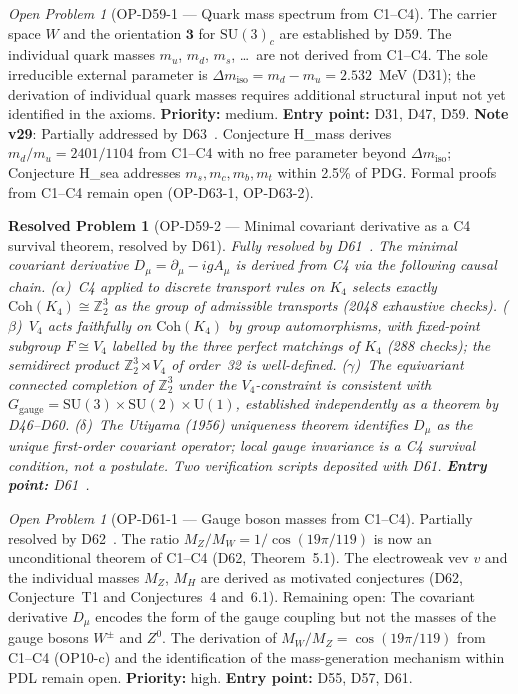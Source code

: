 \documentclass[11pt,a4paper]{article}
\newtheorem{resolvedproblem}{Resolved Problem}
\theoremstyle{plain}
\theoremstyle{definition}
\theoremstyle{remark}
\newtheorem{openproblem}[theorem]{Open Problem}
\begin{document}
\begin{openproblem}[OP-D59-1 --- Quark mass spectrum from C1--C4]
\label{op:D59one}
The carrier space $W$ and the orientation $\mathbf{3}$ for $\mathrm{SU}(3)_c$ are established by D59. The individual quark masses $m_u$, $m_d$, $m_s$, \ldots\ are not derived from C1--C4. The sole irreducible external parameter is $\Delta m_{\mathrm{iso}} = m_d - m_u = 2.532$~MeV (D31); the derivation of individual quark masses requires additional structural input not yet identified in the axioms. \textbf{Priority:} medium. \textbf{Entry point:} D31, D47, D59. \textbf{Note v29}: Partially addressed by D63~\cite{D63}. Conjecture H\_mass derives $m_d/m_u = 2401/1104$ from C1--C4 with no free parameter beyond $\Delta m_{\mathrm{iso}}$; Conjecture H\_sea addresses $m_s, m_c, m_b, m_t$ within 2.5\% of PDG. Formal proofs from C1--C4 remain open (OP-D63-1, OP-D63-2).
\end{openproblem}
 
\begin{resolvedproblem}[OP-D59-2 --- Minimal covariant derivative as a C4 survival theorem, resolved by D61]
\label{op:D59two}
\textcolor{proofblue}{Fully resolved by D61~\cite{D61}.} The minimal covariant derivative $D_\mu = \partial_\mu - igA_\mu$ is derived from C4 via the following causal chain. ($\alpha$)~C4 applied to discrete transport rules on $K_4$ selects exactly $\mathrm{Coh}(K_4) \cong \mathbb{Z}_2^3$ as the group of admissible transports (2048 exhaustive checks). ($\beta$)~$V_4$ acts faithfully on $\mathrm{Coh}(K_4)$ by group automorphisms, with fixed-point subgroup $F \cong V_4$ labelled by the three perfect matchings of $K_4$ (288 checks); the semidirect product $\mathbb{Z}_2^3 \rtimes V_4$ of order~32 is well-defined. ($\gamma$)~The equivariant connected completion of $\mathbb{Z}_2^3$ under the $V_4$-constraint is consistent with $G_\mathrm{gauge} = \mathrm{SU}(3)\times\mathrm{SU}(2)\times\mathrm{U}(1)$, established independently as a theorem by D46--D60. ($\delta$)~The Utiyama (1956) uniqueness theorem identifies $D_\mu$ as the unique first-order covariant operator; local gauge invariance is a C4 survival condition, not a postulate. Two verification scripts deposited with D61. \textbf{Entry point:} D61~\cite{D61}.
\end{resolvedproblem}

\begin{openproblem}[OP-D61-1 --- Gauge boson masses from C1--C4] \textcolor{proofblue}{Partially resolved by D62~\cite{D62}.} The ratio $M_Z/M_W = 1/\cos(19\pi/119)$ is now an unconditional theorem of C1--C4 (D62, Theorem~5.1). The electroweak vev $v$ and the individual masses $M_Z$, $M_H$ are derived as motivated conjectures (D62, Conjecture~T1 and Conjectures~4 and~6.1). Remaining open:
\label{op:D61one}
The covariant derivative $D_\mu$ encodes the form of the gauge coupling but not the masses of the gauge bosons $W^\pm$ and $Z^0$. The derivation of $M_W/M_Z = \cos(19\pi/119)$ from C1--C4 (OP10-c) and the identification of the mass-generation mechanism within PDL remain open. \textbf{Priority:} high. \textbf{Entry point:} D55, D57, D61.
\end{openproblem}
\end{document}
